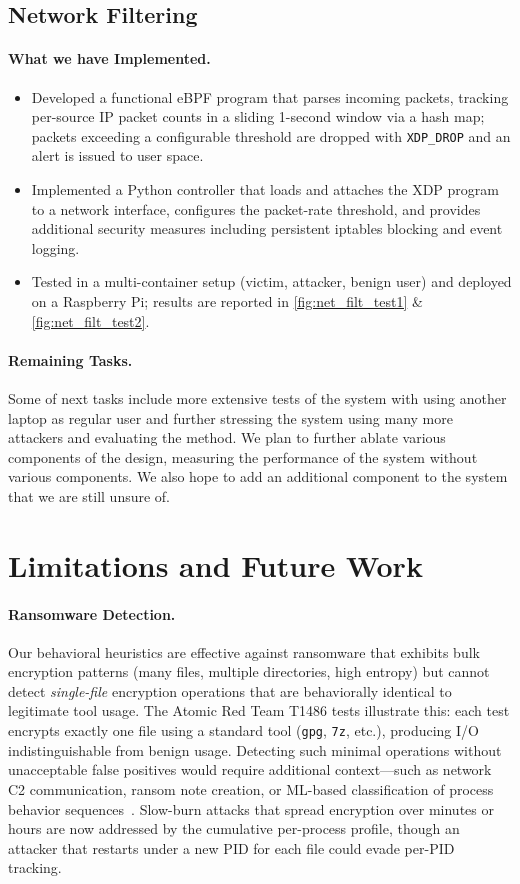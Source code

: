 \documentclass[twocolumn, 10pt]{scrartcl}
\begin{document}
\subsection{Network Filtering}
\paragraph{What we have Implemented.} 

\begin{itemize}
    \item Developed a functional eBPF program that parses incoming packets, tracking per-source IP packet counts in a sliding 1-second window via a hash map; packets exceeding a configurable threshold are dropped with \texttt{XDP\_DROP} and an alert is issued to user space.
    \item Implemented a Python controller that loads and attaches the XDP program to a network interface, configures the packet-rate threshold, and provides additional security measures including persistent iptables blocking and event logging.
    \item Tested in a multi-container setup (victim, attacker, benign user) and deployed on a Raspberry Pi; results are reported in \cref{fig:net_filt_test1} \& \cref{fig:net_filt_test2}.
\end{itemize}
\paragraph{Remaining Tasks.} Some of next tasks include more extensive tests of the system with using another laptop as regular user and further stressing the system using many more attackers and evaluating the method. We plan to further ablate various components of the design, measuring the performance of the system without various components. We also hope to add an additional component to the system that we are still unsure of.

\section{Limitations and Future Work}

\paragraph{Ransomware Detection.}
Our behavioral heuristics are effective against ransomware that exhibits bulk encryption patterns (many files, multiple directories, high entropy) but cannot detect \emph{single-file} encryption operations that are behaviorally identical to legitimate tool usage. The Atomic Red Team T1486 tests illustrate this: each test encrypts exactly one file using a standard tool (\texttt{gpg}, \texttt{7z}, etc.), producing I/O indistinguishable from benign usage. Detecting such minimal operations without unacceptable false positives would require additional context---such as network C2 communication, ransom note creation, or ML-based classification of process behavior sequences~\cite{philippart2024}. Slow-burn attacks that spread encryption over minutes or hours are now addressed by the cumulative per-process profile, though an attacker that restarts under a new PID for each file could evade per-PID tracking.
\end{document}
